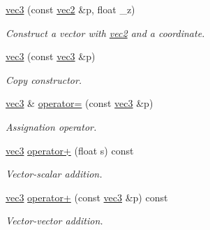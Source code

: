 \begin{DoxyCompactItemize}
\hyperlink{structphysim_1_1math_1_1vec3_a642e0c0de2dd923c0cb9298fa0387a02}{vec3} (const \hyperlink{structphysim_1_1math_1_1vec2}{vec2} \&p, float \+\_\+z)
\begin{DoxyCompactList}\small\item\em Construct a vector with \hyperlink{structphysim_1_1math_1_1vec2}{vec2} and a coordinate. \end{DoxyCompactList}\item 
\mbox{\label{structphysim_1_1math_1_1vec3_affc1af33c1819dab953343ef559aa380}} 
\hyperlink{structphysim_1_1math_1_1vec3_affc1af33c1819dab953343ef559aa380}{vec3} (const \hyperlink{structphysim_1_1math_1_1vec3}{vec3} \&p)
\begin{DoxyCompactList}\small\item\em Copy constructor. \end{DoxyCompactList}\item 
\mbox{\label{structphysim_1_1math_1_1vec3_a60203a4a0e360f214502121444a70df8}} 
\hyperlink{structphysim_1_1math_1_1vec3}{vec3} \& \hyperlink{structphysim_1_1math_1_1vec3_a60203a4a0e360f214502121444a70df8}{operator=} (const \hyperlink{structphysim_1_1math_1_1vec3}{vec3} \&p)
\begin{DoxyCompactList}\small\item\em Assignation operator. \end{DoxyCompactList}\item 
\mbox{\label{structphysim_1_1math_1_1vec3_a7f4e1a1a20371a35c12b3d9e6491faa5}} 
\hyperlink{structphysim_1_1math_1_1vec3}{vec3} \hyperlink{structphysim_1_1math_1_1vec3_a7f4e1a1a20371a35c12b3d9e6491faa5}{operator+} (float s) const
\begin{DoxyCompactList}\small\item\em Vector-\/scalar addition. \end{DoxyCompactList}\item 
\mbox{\label{structphysim_1_1math_1_1vec3_a71fa48c7c4b2cc85090b83caf3b0ca8a}} 
\hyperlink{structphysim_1_1math_1_1vec3}{vec3} \hyperlink{structphysim_1_1math_1_1vec3_a71fa48c7c4b2cc85090b83caf3b0ca8a}{operator+} (const \hyperlink{structphysim_1_1math_1_1vec3}{vec3} \&p) const
\begin{DoxyCompactList}\small\item\em Vector-\/vector addition. \end{DoxyCompactList}\item 

\end{DoxyCompactItemize}
